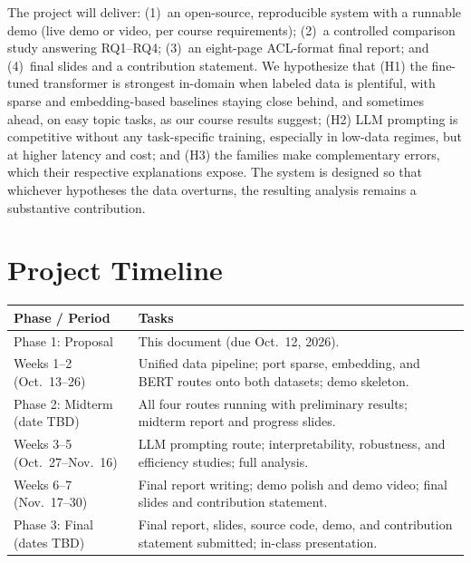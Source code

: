 \documentclass[11pt]{article}
\begin{document}
The project will deliver: (1)~an open-source, reproducible system with a runnable demo (live demo or video, per course requirements); (2)~a controlled comparison study answering RQ1--RQ4; (3)~an eight-page ACL-format final report; and (4)~final slides and a contribution statement. We hypothesize that (H1) the fine-tuned transformer is strongest in-domain when labeled data is plentiful, with sparse and embedding-based baselines staying close behind, and sometimes ahead, on easy topic tasks, as our course results suggest; (H2) LLM prompting is competitive without any task-specific training, especially in low-data regimes, but at higher latency and cost; and (H3) the families make complementary errors, which their respective explanations expose. The system is designed so that whichever hypotheses the data overturns, the resulting analysis remains a substantive contribution.

\section{Project Timeline}

{\small
\begin{tabular}{@{}p{2.4cm}p{4.85cm}@{}}
\toprule
\textbf{Phase / Period} & \textbf{Tasks} \\
\midrule
Phase 1: Proposal & This document (due Oct.\ 12, 2026). \\
\midrule
Weeks 1--2 (Oct.\ 13--26) & Unified data pipeline; port sparse, embedding, and BERT routes onto both datasets; demo skeleton. \\
\midrule
Phase 2: Midterm (date TBD) & All four routes running with preliminary results; midterm report and progress slides. \\
\midrule
Weeks 3--5 (Oct.\ 27--Nov.\ 16) & LLM prompting route; interpretability, robustness, and efficiency studies; full analysis. \\
\midrule
Weeks 6--7 (Nov.\ 17--30) & Final report writing; demo polish and demo video; final slides and contribution statement. \\
\midrule
Phase 3: Final (dates TBD) & Final report, slides, source code, demo, and contribution statement submitted; in-class presentation. \\
\bottomrule
\end{tabular}
}


\end{document}

